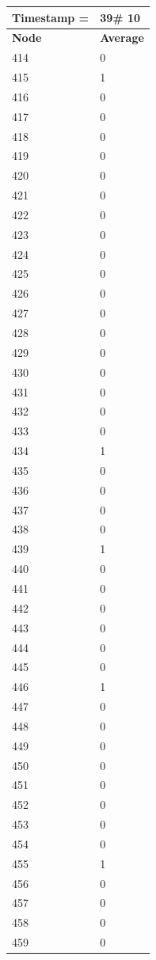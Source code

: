 \begin{tabular}{|l||l|}
\hline
\textbf{Timestamp =} & \textbf{39}\# 10\\\hline
	\textbf{Node} & \textbf{Average} \\ \hline
\hline
	414 & 0 \\ \hline
	415 & 1 \\ \hline
	416 & 0 \\ \hline
	417 & 0 \\ \hline
	418 & 0 \\ \hline
	419 & 0 \\ \hline
	420 & 0 \\ \hline
	421 & 0 \\ \hline
	422 & 0 \\ \hline
	423 & 0 \\ \hline
	424 & 0 \\ \hline
	425 & 0 \\ \hline
	426 & 0 \\ \hline
	427 & 0 \\ \hline
	428 & 0 \\ \hline
	429 & 0 \\ \hline
	430 & 0 \\ \hline
	431 & 0 \\ \hline
	432 & 0 \\ \hline
	433 & 0 \\ \hline
	434 & 1 \\ \hline
	435 & 0 \\ \hline
	436 & 0 \\ \hline
	437 & 0 \\ \hline
	438 & 0 \\ \hline
	439 & 1 \\ \hline
	440 & 0 \\ \hline
	441 & 0 \\ \hline
	442 & 0 \\ \hline
	443 & 0 \\ \hline
	444 & 0 \\ \hline
	445 & 0 \\ \hline
	446 & 1 \\ \hline
	447 & 0 \\ \hline
	448 & 0 \\ \hline
	449 & 0 \\ \hline
	450 & 0 \\ \hline
	451 & 0 \\ \hline
	452 & 0 \\ \hline
	453 & 0 \\ \hline
	454 & 0 \\ \hline
	455 & 1 \\ \hline
	456 & 0 \\ \hline
	457 & 0 \\ \hline
	458 & 0 \\ \hline
	459 & 0 \\ \hline
\end{tabular}
